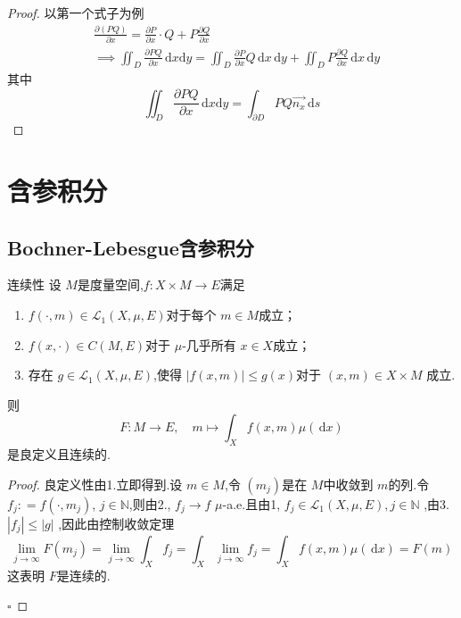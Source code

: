 \documentclass[lang=cn,12pt,color=green,fontset=none]{elegantbook}
\begin{document}
\begin{proof}
    以第一个式子为例 $$
    \begin{aligned}
       & \frac{\partial \left( PQ \right) }{\partial x} = \frac{\partial P}{\partial x} \cdot  Q+  P \frac{\partial Q}{\partial x} \\ 
         & \implies \iint_{D} \frac{\partial PQ}{\partial x} \,\mathrm{d}x \mathrm{d} y = \iint_{D} \frac{\partial P}{\partial x}Q \,\mathrm{d}x \,\mathrm{d}y +  \iint_{D} P \frac{\partial Q}{\partial x} \,\mathrm{d}x   \,\mathrm{d}y 
    \end{aligned}
    $$
    其中 $$
     \iint_{D} \frac{\partial PQ}{\partial x} \,\mathrm{d}x \mathrm{d} y = \int_{ \partial D        } PQ \vec{n_{x }} \,\mathrm{d}s
    $$ 
\end{proof}


\chapter{含参积分}

\section{Bochner-Lebesgue含参积分}

\begin{theorem}{连续性}
    设 $ M $是度量空间,$ f:X\times M\to E $满足 
    \begin{enumerate}
        \item $ f\left( \cdot ,m \right)\in \mathcal{L}_{1}\left( X,\mu ,E \right)   $对于每个 $ m \in M $成立；
        \item  $ f\left( x,\cdot  \right)\in C\left( M,E \right)   $对于 $ \mu  $-几乎所有 $ x \in X $成立；
        \item 存在 $ g \in \mathcal{L}_{1}\left( X,\mu ,E \right)  $,使得 $ \left| f\left( x,m \right)  \right|\le g\left( x \right)   $对于 $ \left( x,m \right)\in X\times M  $   成立.
    \end{enumerate}
    则 $$
    F:M\to E,\quad  m\mapsto \int_{X}f\left( x,m \right)\mu \left( \,\mathrm{d} x \right)  
    $$是良定义且连续的.
\end{theorem}
\begin{proof}
    良定义性由1.立即得到.设 $ m \in M $,令 $ \left( m_{j} \right)  $是在 $ M $中收敛到 $ m $的列.令 $ f_{j}: = f\left( \cdot ,m_{j} \right)  $, $ j \in \mathbb{N}  $,则由2., $ f_{j}\to f $ $ \mu  $-a.e.且由1, $ f_{j} \in \mathcal{L}_{1}\left( X,\mu ,E \right), j \in \mathbb{N}   $ ,由3. $ \left| f_{j} \right| \le  \left| g \right|  $   ,因此由控制收敛定理 $$
    \lim_{j \to \infty} F\left( m_{j} \right) = \lim_{j \to \infty}\int_{X}f_{j}=    \int_{X}\lim_{j \to \infty}f_{j} = \int_{X} f\left( x,m \right)\mu \left( \,\mathrm{d} x\right) = F\left( m \right)   
    $$这表明 $ F $是连续的. 

    \hfill $\square$
\end{proof}
\end{document}
